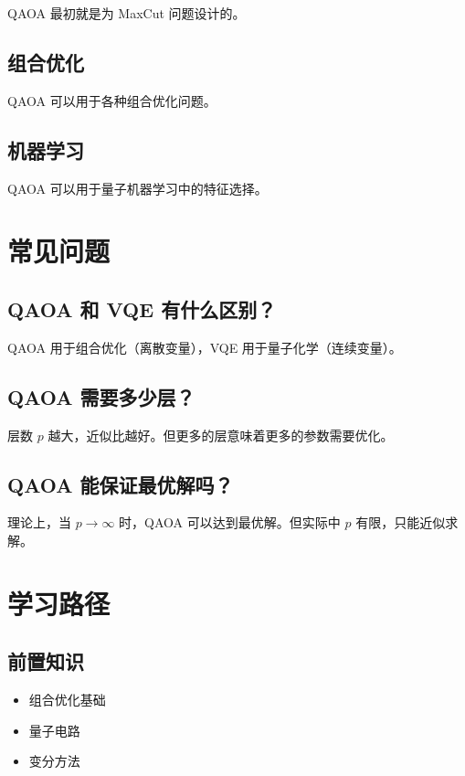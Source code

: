 \documentclass[12pt,a4paper]{article}
\begin{document}
QAOA 最初就是为 MaxCut 问题设计的。

\subsection{组合优化}

QAOA 可以用于各种组合优化问题。

\subsection{机器学习}

QAOA 可以用于量子机器学习中的特征选择。

\section{常见问题}

\subsection{QAOA 和 VQE 有什么区别？}

QAOA 用于组合优化（离散变量），VQE 用于量子化学（连续变量）。

\subsection{QAOA 需要多少层？}

层数 $p$ 越大，近似比越好。但更多的层意味着更多的参数需要优化。

\subsection{QAOA 能保证最优解吗？}

理论上，当 $p \to \infty$ 时，QAOA 可以达到最优解。但实际中 $p$ 有限，只能近似求解。

\section{学习路径}

\subsection{前置知识}
\begin{itemize}
  \item 组合优化基础
  \item 量子电路
  \item 变分方法
\end{itemize}
\end{document}
